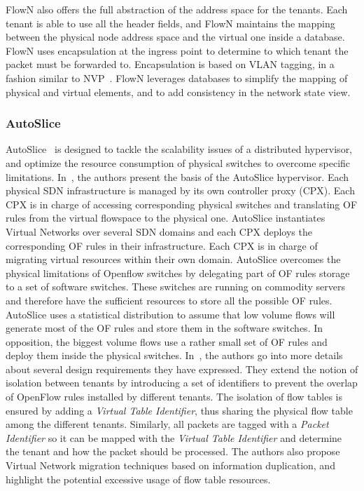 FlowN also offers the full abstraction of the address space for the tenants.
Each tenant is able to use all the header fields, and FlowN maintains the mapping between the physical node address space and the virtual one inside a database. FlowN uses encapsulation at the ingress point to determine to which tenant the packet must be forwarded to. Encapsulation is based on VLAN tagging, in a fashion similar to NVP~\cite{NVP-Koponen2014}.
FlowN leverages databases to simplify the mapping of physical and virtual elements, and to add consistency in the network state view.  


\subsubsection{AutoSlice}
AutoSlice~\cite{AutoSlice-Bozakov2012} is designed to tackle the scalability issues of a distributed hypervisor, and optimize the resource consumption of physical switches to overcome specific limitations.
In~\cite{AutoSlice-Bozakov2012}, the authors present the basis of the AutoSlice hypervisor.
Each physical SDN infrastructure is managed by its own controller proxy (CPX).
Each CPX is in charge of accessing corresponding physical switches and translating OF rules from the virtual flowspace to the physical one.
AutoSlice instantiates Virtual Networks over several SDN domains and each CPX deploys the corresponding OF rules in their infrastructure.
Each CPX is in charge of migrating virtual resources within their own domain.
AutoSlice overcomes the physical limitations of Openflow switches by delegating part of OF rules storage to a set of software switches.
These switches are running on commodity servers and therefore have the sufficient resources to store all the possible OF rules.
AutoSlice uses a statistical distribution to assume that low volume flows will generate most of the OF rules and store them in the software switches. In opposition, the biggest volume flows use a rather small set of OF rules and deploy them inside the physical switches.
In~\cite{AutoSlice2-Bozakov2014}, the authors go into more details about several design requirements they have expressed. They extend the notion of isolation between tenants by introducing a set of identifiers to prevent the overlap of OpenFlow rules installed by different tenants.
The isolation of flow tables is ensured by adding a \textit{Virtual Table Identifier}, thus sharing the physical flow table among the different tenants.
Similarly, all packets are tagged with a \textit{Packet Identifier} so it can be mapped with the \textit{Virtual Table Identifier} and determine the tenant and how the packet should be processed.
The authors also propose Virtual Network migration techniques based on information duplication, and highlight the potential excessive usage of flow table resources.

